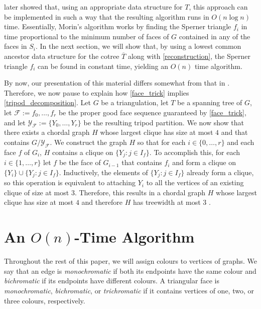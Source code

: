 \documentclass{patmorin}
\begin{document}
\citet{morin:fast} later showed that, using an appropriate data structure for $T$, this approach can be implemented in such a way that the resulting algorithm runs in $O(n\log n)$ time.  Essentially, Morin's algorithm works by finding the Sperner triangle $f_i$ in time proportional to the minimum number of faces of $G$ contained in any of the faces in $S_i$.  In the next section, we will show that, by using a lowest common ancestor data structure for the cotree $\overline{T}$ along with \cref{reconstruction}, the Sperner triangle $f_i$ can be found in constant time, yielding an $O(n)$ time algorithm.

By now, our presentation of this material differs somewhat from that in \cite{dujmovic.joret.ea:planar,ueckerdt.wood.ea:improved}.  Therefore, we now pause to explain how \cref{face_trick} implies \cref{tripod_decomposition}. %
Let $G$ be a triangulation, let $T$ be a spanning tree of $G$, let
$\mathcal{F}:=f_0,\ldots,f_r$ be the proper good face sequence guaranteed by \cref{face_trick}, and let $\mathcal{Y}_\mathcal{F}:=\{Y_0,\ldots,Y_r\}$ be the resulting tripod partition. We now show that there exists a chordal graph $H$ whose largest clique has size at most $4$ and that contains $G/\mathcal{Y}_\mathcal{F}$. We construct the graph $H$ so that for each $i\in\{0,\ldots,r\}$ and each face $f$ of $G_i$, $H$ contains a clique on $\{Y_j:j\in I_f\}$. To accomplish this, for each $i\in\{1,\ldots,r\}$ let $f$ be the face of $G_{i-1}$ that contains $f_i$ and form a clique on $\{Y_i\}\cup\{Y_j:j\in I_f\}$.  Inductively, the elements of $\{Y_j:j\in I_f\}$ already form a clique, so this operation is equivalent to attaching $Y_i$ to all the vertices of an existing clique of size at most $3$. Therefore, this results in a chordal graph $H$ whose largest clique has size at most $4$ and therefore $H$ has treewidth at most $3$ \cite{gavril:intersection}.

\section{\boldmath An \texorpdfstring{$O(n)$}{O(n)}-Time Algorithm}
\label{linear_time_algorithm}\label{algorithm}

Throughout the rest of this paper, we will assign colours to vertices of graphs.  We say that an edge is \emph{monochromatic} if both its endpoints have the same colour and \emph{bichromatic} if its endpoints have different colours.  A triangular face is \emph{monochromatic}, \emph{bichromatic}, or \emph{trichromatic} if it contains vertices of one, two, or three colours, respectively.
\end{document}
